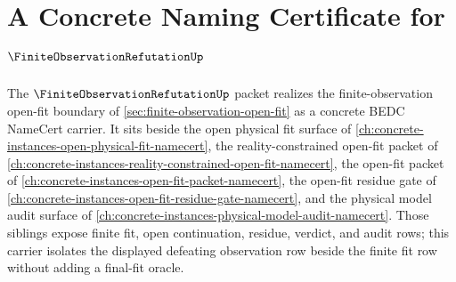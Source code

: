 \chapter{A Concrete Naming Certificate for $\FiniteObservationRefutationUp$}
\label{ch:concrete-instances-finite-observation-refutation-namecert}

The $\FiniteObservationRefutationUp$ packet realizes the finite-observation open-fit boundary of \autoref{sec:finite-observation-open-fit} as a concrete BEDC NameCert carrier. It sits beside the open physical fit surface of \autoref{ch:concrete-instances-open-physical-fit-namecert}, the reality-constrained open-fit packet of \autoref{ch:concrete-instances-reality-constrained-open-fit-namecert}, the open-fit packet of \autoref{ch:concrete-instances-open-fit-packet-namecert}, the open-fit residue gate of \autoref{ch:concrete-instances-open-fit-residue-gate-namecert}, and the physical model audit surface of \autoref{ch:concrete-instances-physical-model-audit-namecert}. Those siblings expose finite fit, open continuation, residue, verdict, and audit rows; this carrier isolates the displayed defeating observation row beside the finite fit row without adding a final-fit oracle.


